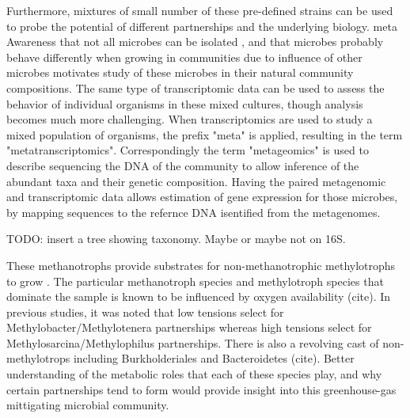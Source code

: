 Furthermore, mixtures of small number of these pre-defined strains can be used to probe the potential of different partnerships and the underlying biology.
meta
Awareness that not all microbes can be isolated \cite{kaeberlein2002}, and that microbes probably behave differently when growing in communities due to influence of other microbes motivates study of these microbes in their natural community compositions.
The same type of transcriptomic data can be used to assess the behavior of individual organisms in these mixed cultures, though analysis becomes much more challenging.
When transcriptomics are used to study a mixed population of organisms, the prefix "meta" is applied, resulting in the term "metatranscriptomics".
Correspondingly the term "metageomics" is used to describe sequencing the DNA of the community to allow inference of the abundant taxa and their genetic composition.
Having the paired metagenomic and transcriptomic data allows estimation of gene expression for those microbes, by mapping sequences to the refernce DNA isentified from the metagenomes.


TODO: insert a tree showing taxonomy.  Maybe or maybe not on 16S.

These methanotrophs provide substrates for non-methanotrophic methylotrophs to grow \cite{beck2013LW}.
The particular methanotroph species and methylotroph species that dominate the sample is known to be influenced by oxygen availability (cite).
In previous studies, it was noted that low  tensions select for Methylobacter/Methylotenera partnerships whereas high  tensions select for Methylosarcina/Methylophilus partnerships.
There is also a revolving cast of non-methylotrops including Burkholderiales and Bacteroidetes (cite).
Better understanding of the metabolic roles that each of these species play, and why certain partnerships tend to form would provide insight into this greenhouse-gas mittigating microbial community.

